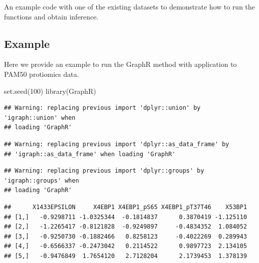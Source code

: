 \documentclass[
]{book}
\newenvironment{Shaded}{\begin{snugshade}}{\end{snugshade}}
\newcommand{\DecValTok}[1]{\textcolor[rgb]{0.00,0.00,0.81}{#1}}
\newcommand{\FunctionTok}[1]{\textcolor[rgb]{0.00,0.00,0.00}{#1}}
\newcommand{\NormalTok}[1]{#1}
\newcommand{\OtherTok}[1]{\textcolor[rgb]{0.56,0.35,0.01}{#1}}
\newcommand{\SpecialCharTok}[1]{\textcolor[rgb]{0.00,0.00,0.00}{#1}}
\newcommand{\StringTok}[1]{\textcolor[rgb]{0.31,0.60,0.02}{#1}}
\begin{document}
An example code with one of the existing datasets to demonstrate how to run the functions and obtain inference.

\hypertarget{example-1}{%
\subsection{Example}\label{example-1}}

Here we provide an example to run the GraphR method with application to PAM50 protiomics data.

\begin{Shaded}
\begin{Highlighting}[]
\FunctionTok{set.seed}\NormalTok{(}\DecValTok{100}\NormalTok{)}
\FunctionTok{library}\NormalTok{(GraphR)}
\end{Highlighting}
\end{Shaded}

\begin{verbatim}
## Warning: replacing previous import 'dplyr::union' by 'igraph::union' when
## loading 'GraphR'
\end{verbatim}

\begin{verbatim}
## Warning: replacing previous import 'dplyr::as_data_frame' by
## 'igraph::as_data_frame' when loading 'GraphR'
\end{verbatim}

\begin{verbatim}
## Warning: replacing previous import 'dplyr::groups' by 'igraph::groups' when
## loading 'GraphR'
\end{verbatim}

\begin{Shaded}
\end{Shaded}

\begin{verbatim}
##      X1433EPSILON     X4EBP1 X4EBP1_pS65 X4EBP1_pT37T46    X53BP1
## [1,]   -0.9298711 -1.0325344  -0.1814837      0.3870419 -1.125110
## [2,]   -1.2265417 -0.8121828  -0.9249897     -0.4834352  1.084052
## [3,]   -0.9250730 -0.1882466   0.8258123     -0.4022269  0.289943
## [4,]   -0.6566337 -0.2473042   0.2114522      0.9897723  2.134105
## [5,]   -0.9476849  1.7654120   2.7128204      2.1739453  1.378139
\end{verbatim}
\end{document}
